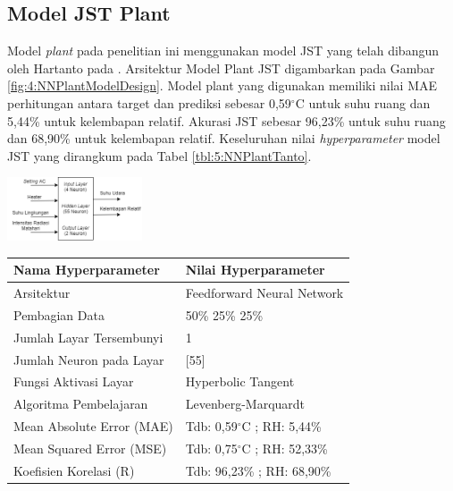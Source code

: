 \documentclass[a4paper,10pt]{article}
\makeatletter
\newenvironment{body}{\begin{multicols}{2}}{\end{multicols}}
\renewenvironment{table}
{\def\@captype{table}%
	\captionsetup{format=plain,labelsep=newline,font=footnotesize,textfont=sc,justification=centering}%
	\fontsize{8}{8}\selectfont
}
{}
\renewenvironment{figure}
{\def\@captype{figure}%
	\captionsetup{labelsep=period,format=hang,font=footnotesize,justification=justified}
}
{}
\makeatother
\begin{document}
\begin{body}
		\subsection{Model JST Plant}\label{subsec:4:err}
		
		Model \textit{plant} pada penelitian ini menggunakan model JST yang telah dibangun oleh Hartanto pada \cite{skripsiTanto}. Arsitektur Model Plant JST digambarkan pada Gambar \ref{fig:4:NNPlantModelDesign}. Model plant yang digunakan memiliki nilai MAE perhitungan antara target dan prediksi sebesar 0,59$^{\circ}$C untuk suhu ruang dan 5,44\% untuk kelembapan relatif. Akurasi JST sebesar 96,23\% untuk suhu ruang dan 68,90\% untuk kelembapan relatif. Keseluruhan nilai \textit{hyperparameter} model JST yang dirangkum pada Tabel \ref{tbl:5:NNPlantTanto}.\\
		
		\begin{figure}
			\centering
			\includegraphics[width=0.3\textwidth]{figures/NNPlantModelDesign}
			\caption{Arsitektur Model Plant JST}
			\label{fig:4:NNPlantModelDesign}
		\end{figure}
	
		\begin{table}
			\caption{Tabel Rancangan Model Plant JST\cite{skripsiTanto}}
			\label{tbl:5:NNPlantTanto}
			\centering
			\begin{tabularx}{\linewidth}{ll}\toprule
				\textbf{Nama Hyperparameter} & \textbf{Nilai Hyperparameter} \\ \toprule
				Arsitektur & Feedforward Neural Network \\ \midrule
				Pembagian Data & 50\% 25\% 25\% \\ \midrule 
				Jumlah Layar Tersembunyi & 1 \\ \midrule
				Jumlah Neuron pada Layar & [55] \\ \midrule
				Fungsi Aktivasi Layar & Hyperbolic Tangent \\ \midrule
				Algoritma Pembelajaran & Levenberg-Marquardt \\ \midrule
				Mean Absolute Error (MAE) & Tdb: 0,59$^\circ$C ; RH: 5,44\% \\ \midrule
				Mean Squared Error (MSE) & Tdb: 0,75$^\circ$C ; RH: 52,33\% \\ \midrule
				Koefisien Korelasi (R) & Tdb: 96,23\% ; RH: 68,90\% \\ \bottomrule
			\end{tabularx}
		\end{table}
		

\end{body}
\end{document}
